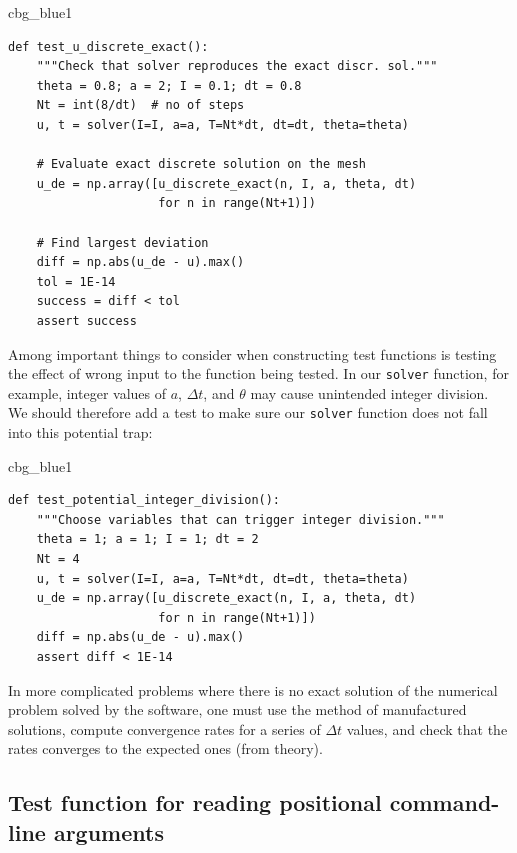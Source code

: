 \documentclass[%
oneside,                 %
final,                   %
10pt]{article}
\newenvironment{_cod_tight}[1]{
   \def\FrameCommand{\colorbox{#1}}
   \FrameRule0.6pt\MakeFramed {\FrameRestore}\vskip3mm}
   {\vskip0mm\endMakeFramed}
\newenvironment{cod}[1]{
\bgroup\rmfamily
\fboxsep=0mm\relax
\begin{_cod_tight}{#1}
\list{}{\parsep=-2mm\parskip=0mm\topsep=0pt\leftmargin=2mm
\rightmargin=2\leftmargin\leftmargin=4pt\relax}
\item\relax}
{\endlist\end{_cod_tight}\egroup}
\begin{document}
\begin{cod}{cbg_blue1}\begin{Verbatim}[numbers=none,fontsize=\fontsize{9pt}{9pt},baselinestretch=0.95,xleftmargin=2mm]
def test_u_discrete_exact():
    """Check that solver reproduces the exact discr. sol."""
    theta = 0.8; a = 2; I = 0.1; dt = 0.8
    Nt = int(8/dt)  # no of steps
    u, t = solver(I=I, a=a, T=Nt*dt, dt=dt, theta=theta)

    # Evaluate exact discrete solution on the mesh
    u_de = np.array([u_discrete_exact(n, I, a, theta, dt)
                     for n in range(Nt+1)])

    # Find largest deviation
    diff = np.abs(u_de - u).max()
    tol = 1E-14
    success = diff < tol
    assert success
\end{Verbatim}
\end{cod}
\noindent

Among important things to consider when constructing test functions
is testing the effect of wrong input to the function being tested.
In our \texttt{solver} function, for example, integer values of $a$, $\Delta t$, and
$\theta$ may cause unintended integer
division. We should therefore add a test to make sure our \texttt{solver}
function does not fall into this potential trap:

\begin{cod}{cbg_blue1}\begin{Verbatim}[numbers=none,fontsize=\fontsize{9pt}{9pt},baselinestretch=0.95,xleftmargin=2mm]
def test_potential_integer_division():
    """Choose variables that can trigger integer division."""
    theta = 1; a = 1; I = 1; dt = 2
    Nt = 4
    u, t = solver(I=I, a=a, T=Nt*dt, dt=dt, theta=theta)
    u_de = np.array([u_discrete_exact(n, I, a, theta, dt)
                     for n in range(Nt+1)])
    diff = np.abs(u_de - u).max()
    assert diff < 1E-14
\end{Verbatim}
\end{cod}
\noindent

In more complicated problems where there is no exact solution of the
numerical problem solved by the software, one must use the method
of manufactured solutions, compute convergence rates for a series
of $\Delta t$ values, and check that the rates converges to the
expected ones (from theory).

\subsection{Test function for reading positional command-line arguments}
\end{document}
